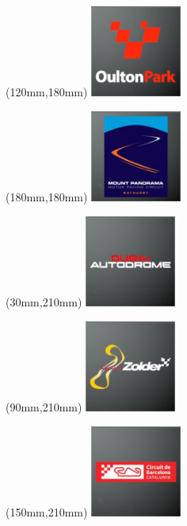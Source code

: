 \begin{textblock*}{30mm}(120mm,180mm)%
\includegraphics[width=30mm]{LG/2015-05-20_00091.png}
\end{textblock*}
\begin{textblock*}{30mm}(180mm,180mm)%
\includegraphics[width=30mm]{LG/2015-05-20_00087.png}
\end{textblock*}
\begin{textblock*}{30mm}(30mm,210mm)%
\includegraphics[width=30mm]{LG/2015-05-20_00081.png}
\end{textblock*}
\begin{textblock*}{30mm}(90mm,210mm)%
\includegraphics[width=30mm]{LG/2015-05-20_00100.png}
\end{textblock*}
\begin{textblock*}{30mm}(150mm,210mm)%
\includegraphics[width=30mm]{LG/2015-05-20_00078.png}
\end{textblock*}
